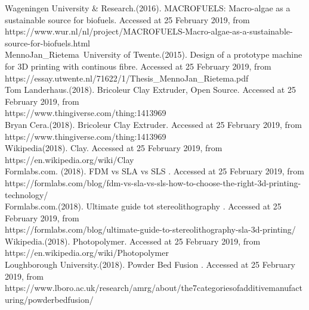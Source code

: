 \documentclass[11pt]{article}
\begin{document}
	Wageningen University \& Research.(2016). MACROFUELS: Macro-algae as a sustainable source for biofuels. Accessed at 25 February 2019, from \\
	https://www.wur.nl/nl/project/MACROFUELS-Macro-algae-as-a-sustainable-source-for-biofuels.html\\
	
	Menno\-Jan\_Rietema\, University of Twente.(2015). Design of a prototype machine for 3D printing with continous fibre. Accessed at 25 February 2019, from \\
	https://essay.utwente.nl/71622/1/Thesis\_Menno\-Jan\_Rietema.pdf\\
	
	Tom Landerhaus.(2018). Bricoleur Clay Extruder, Open Source. Accessed at 25 February 2019, from \\
	https://www.thingiverse.com/thing:1413969\\
	
		Bryan Cera.(2018). Bricoleur Clay Extruder. Accessed at 25 February 2019, from \\ 
	https://www.thingiverse.com/thing:1413969\\
	
\newpage	
	 	Wikipedia(2018). Clay. Accessed at 25 February 2019, from \\ 
	https://en.wikipedia.org/wiki/Clay\\
	
	 	Formlabs.com. (2018). FDM vs SLA vs SLS . Accessed at 25 February 2019, from \\ 
     https://formlabs.com/blog/fdm-vs-sla-vs-sls-how-to-choose-the-right-3d-printing-technology/\\
	
		Formlabs.com.(2018). Ultimate guide tot stereolithography . Accessed at 25 February 2019, from \\ 
	https://formlabs.com/blog/ultimate-guide-to-stereolithography-sla-3d-printing/\\
	
		Wikipedia.(2018). Photopolymer. Accessed at 25 February 2019, from \\ 
	https://en.wikipedia.org/wiki/Photopolymer\\
	
		Loughborough University.(2018). Powder Bed Fusion . Accessed at 25 February 2019, from \\ 
	https://www.lboro.ac.uk/research/amrg/about/the7categoriesofadditivemanufacturing/powderbedfusion/\\
\end{document}
